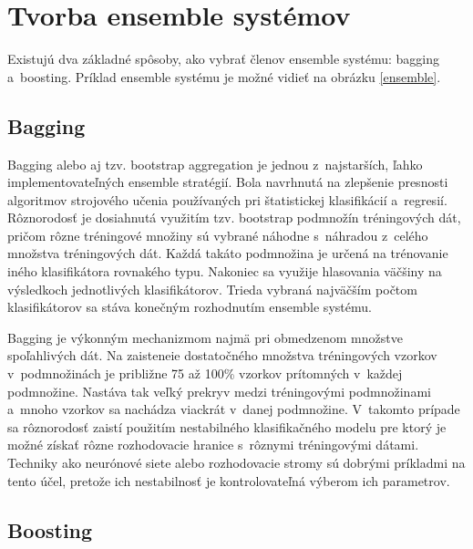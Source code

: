 \section{Tvorba ensemble systémov}

Existujú dva základné spôsoby, ako vybrať členov ensemble systému: bagging a~boosting. Príklad ensemble systému je možné vidieť na obrázku \ref{ensemble}.

\subsection{Bagging}

Bagging \cite{breiman2} alebo aj tzv. bootstrap aggregation je jednou z~najstarších, ľahko implementovateľných ensemble stratégií. Bola navrhnutá na zlepšenie presnosti algoritmov strojového učenia používaných pri štatistickej klasifikácií a~regresií. Rôznorodosť je dosiahnutá využitím tzv. bootstrap podmnožín tréningových dát, pričom rôzne tréningové množiny sú vybrané náhodne s~náhradou z~celého množstva tréningových dát. Každá takáto podmnožina je určená na trénovanie iného klasifikátora rovnakého typu. Nakoniec sa využije hlasovania väčšiny na výsledkoch jednotlivých klasifikátorov. Trieda vybraná najväčším počtom klasifikátorov sa stáva konečným rozhodnutím ensemble systému.

Bagging je výkonným mechanizmom najmä pri obmedzenom množstve spoľahlivých dát. Na zaisteneie dostatočného množstva tréningových vzorkov v~podmnožinách je približne 75 až 100\% vzorkov prítomných v~každej podmnožine. Nastáva tak veľký prekryv medzi tréningovými podmnožinami a~mnoho vzorkov sa nachádza viackrát v~danej podmnožine. V~takomto prípade sa rôznorodosť zaistí použitím nestabilného klasifikačného modelu pre ktorý je možné získať rôzne rozhodovacie hranice s~rôznymi tréningovými dátami. Techniky ako neurónové siete alebo rozhodovacie stromy sú dobrými príkladmi na tento účel, pretože ich nestabilnosť je kontrolovateľná výberom ich parametrov.

\subsection{Boosting}

